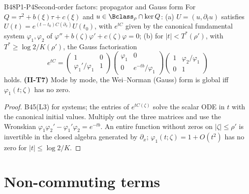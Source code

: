\begin{dimcard}{B48}{P1-P4}{Second-order factors: propagator and Gauss form}{\proved}{}
\label{dim:II-T7}%
For $Q=\tau^2+b(\xi)\tau+c(\xi)$ and $u\in\Bclass_\rho\cap\ker Q$: (a) $U=(u,\partial_tu)$ satisfies $U(t)=e^{(t-t_0)C(\partial_x)}U(t_0)$, with $e^{tC}$ given by the canonical fundamental system $\varphi_1,\varphi_2$ of $\varphi''+b(\zeta)\varphi'+c(\zeta)\varphi=0$; (b) for $|t|<T^*(\rho')$, with $T^*\ge\log2/K(\rho')$, the Gauss factorisation
\[
e^{tC}=\begin{pmatrix}1&0\\\varphi_1'/\varphi_1&1\end{pmatrix}\begin{pmatrix}\varphi_1&0\\0&e^{-tb}/\varphi_1\end{pmatrix}\begin{pmatrix}1&\varphi_2/\varphi_1\\0&1\end{pmatrix}
\]
holds. \textbf{(II-T7)} Mode by mode, the Wei--Norman (Gauss) form is global iff $\varphi_1(t;\zeta)$ has no zero.
\end{dimcard}
\begin{proof}
B45(L3) for systems; the entries of $e^{tC(\zeta)}$ solve the scalar ODE in $t$ with the canonical initial values.
Multiply out the three matrices and use the Wronskian $\varphi_1\varphi_2'-\varphi_1'\varphi_2=e^{-tb}$. An entire function without zeros on $|\zeta|\le\rho'$ is invertible in the closed algebra generated by $\partial_x$; $\varphi_1(t;\zeta)=1+O(t^2)$ has no zero for $|t|\le\log2/K$.
\end{proof}

\section{Non-commuting terms}

